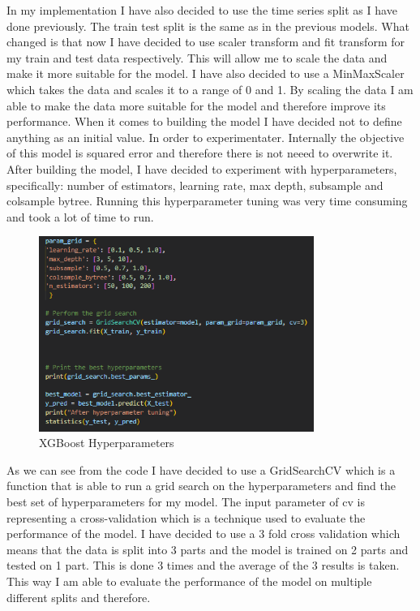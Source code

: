 \documentclass{imc-inf}
\begin{document}
			In my implementation I have also decided to use the time series split as I have done previously. The train test split is the same as in the previous models. What changed is that now I have decided to use 
			scaler transform and fit transform for my train and test data respectively. This will allow me to scale the data and make it more suitable for the model. I have also decided to use a MinMaxScaler which takes 
			the data and scales it to a range of 0 and 1. By scaling the data I am able to make the data more suitable for the model and therefore improve its performance. When it comes to building the model I have decided not to define
			anything as an initial value. In order to experimentater. Internally the objective of this model is squared error and therefore there is not neeed to overwrite it. After building the model, I have decided to 
			experiment with hyperparameters, specifically: number of estimators, learning rate, max depth, subsample and colsample bytree. Running this hyperparameter tuning was very time consuming and took a lot of time to run. 
			\begin{figure}[h]
				\centering
				\includegraphics[width=0.8\textwidth]{xgboost_tuning_code.png}
				\caption{XGBoost Hyperparameters}
				\label{fig:xgboost_hyperparameters}
			\end{figure}
			As we can see from the code I have decided to use a GridSearchCV which is a function that is able to run a grid search on the hyperparameters and find the best set of hyperparameters for my model.
			The input parameter of cv is representing a cross-validation which is a technique used to evaluate the performance of the model. I have decided to use a 3 fold cross validation which means that the data is split into 3 parts and
			the model is trained on 2 parts and tested on 1 part. This is done 3 times and the average of the 3 results is taken. This way I am able to evaluate the performance of the model on multiple different splits and therefore.
\end{document}

